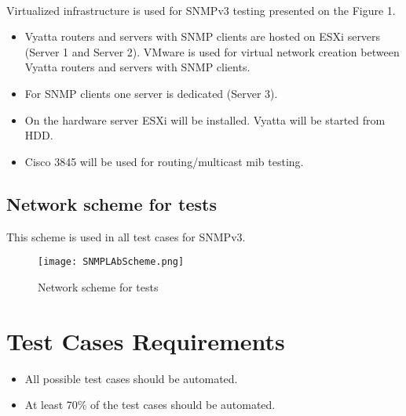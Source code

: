 \documentclass[a4paper,11pt]{article}
\begin{document}
\paragraph{} Virtualized infrastructure is used for SNMPv3 testing presented on the Figure 1.
\begin{itemize}
\item Vyatta routers and servers with SNMP clients are hosted on ESXi servers (Server 1 and Server 2). VMware is used for virtual network creation between Vyatta routers and servers with SNMP clients.
\item For SNMP clients one server is dedicated (Server 3).
\item On the hardware server ESXi will be installed. Vyatta will be started from HDD.
\item Cisco 3845 will be used for routing/multicast mib testing.
\end{itemize}

\subsection{Network scheme for tests}
This scheme is used in all test cases for SNMPv3.

\begin{figure}[hb]
\caption{Network scheme for tests}
 \begin{center}
  \texttt{[image: SNMPLAbScheme.png]}
 \end{center}
\label{fig:MainScheme}
\end{figure}



\section{Test Cases Requirements}

\begin{itemize}
\item All possible test cases should be automated.
\item At least 70\% of the test cases should be automated.
\end{itemize}
\end{document}
